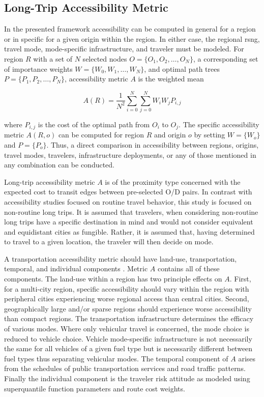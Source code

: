 \documentclass[11pt]{article}
\begin{document}
\begin{multicols}{2}
\subsection*{Long-Trip Accessibility Metric}

In the presented framework accessibility can be computed in general for a region or in specific for a given origin within the region. In either case, the regional \gls{rsng}, travel mode, mode-specific infrastructure, and traveler must be modeled. For region $R$ with a set of $N$ selected nodes $O = \{O_1, O_2, \dots, O_N\}$, a corresponding set of importance weights $W = \{W_0, W_1, \dots, W_N\}$, and optimal path trees $P = \{P_1, P_2, \dots, P_N\}$, accessibility metric $A$ is the weighted mean

\begin{equation}
	A(R) = \frac{1}{N^2}\sum_{i = 0}^{N} \sum_{j = 0 }^{N} W_iW_jP_{i,j} \label{eq:a}
\end{equation}

\noindent where $P_{i,j}$ is the cost of the optimal path from $O_i$ to $O_j$. The specific accessibility metric $A(R, o)$ can be computed for region $R$ and origin $o$ by setting $W = \{W_o\}$ and $P = \{P_o\}$. Thus, a direct comparison in accessibility between regions, origins, travel modes, travelers, infrastructure deployments, or any of those mentioned in any combination can be conducted.

Long-trip accessibility metric $A$ is of the proximity type concerned with the expected cost to transit edges between pre-selected O/D pairs. In contrast with accessibility studies focused on routine travel behavior, this study is focused on non-routine long trips. It is assumed that travelers, when considering non-routine long trips have a specific destination in mind and would not consider equivalent and equidistant cities as fungible. Rather, it is assumed that, having determined to travel to a given location, the traveler will then decide on mode.

A transportation accessibility metric should have land-use, transportation, temporal, and individual components \cite{Karst_2003}. Metric $A$ contains all of these components. The land-use within a region has two principle effects on $A$. First, for a multi-city region, specific accessibility should vary within the region with peripheral cities experiencing worse regional access than central cities. Second, geographically large and/or sparse regions should experience worse accessibility than compact regions. The transportation infrastructure determines the efficacy of various modes. Where only vehicular travel is concerned, the mode choice is reduced to vehicle choice. Vehicle mode-specific infrastructure is not necessarily the same for all vehicles of a given fuel type but is necessarily different between fuel types thus separating vehicular modes. The temporal component of $A$ arises from the schedules of public transportation services and road traffic patterns. Finally the individual component is the traveler risk attitude as modeled using superquantile function parameters and route cost weights.


\end{multicols}
\end{document}
